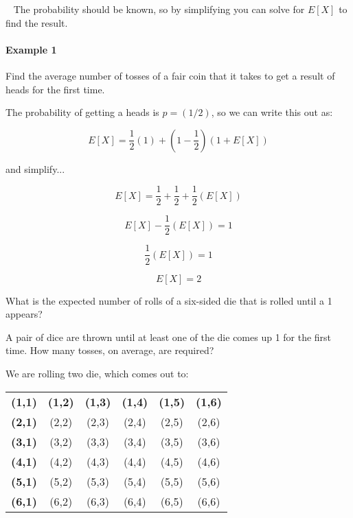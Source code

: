 {\begin{intro}{\ }
            The probability should be known, so by simplifying you
            can solve for $E[X]$ to find the result.

            \paragraph{Example 1}
                Find the average number of tosses of a fair coin that it takes
                to get a result of heads for the first time.

                The probability of getting a heads is $p = (1/2)$, so we
                can write this out as:

                $$ E[X] = \frac{1}{2}(1) + (1 - \frac{1}{2})(1 + E[X]) $$

                and simplify...

                $$ E[X] = \frac{1}{2} + \frac{1}{2} + \frac{1}{2}(E[X]) $$

                $$ E[X] - \frac{1}{2}(E[X]) = 1 $$

                $$ \frac{1}{2}(E[X]) = 1 $$

                $$ E[X] = 2 $$
        \end{intro}

    \newpage

    \begin{questionNOGRADE}{\thequestion}
        What is the expected number of rolls of a six-sided die
        that is rolled until a 1 appears? ~\\ \vspace{3cm}
    \end{questionNOGRADE}

    \hrulefill

    \begin{questionNOGRADE}{\thequestion}
        A pair of dice are thrown until at least one of the die comes
        up 1 for the first time. How many tosses,
        on average, are required?

        We are rolling two die, which comes out to:

        \begin{center}
            \footnotesize
            \begin{tabular}{c c c c c c}
                \textbf{(1,1)} & \textbf{(1,2)} & \textbf{(1,3)} & \textbf{(1,4)} & \textbf{(1,5)} & \textbf{(1,6)} \\
                \textbf{(2,1)} & (2,2) & (2,3) & (2,4) & (2,5) & (2,6) \\
                \textbf{(3,1)} & (3,2) & (3,3) & (3,4) & (3,5) & (3,6) \\
                \textbf{(4,1)} & (4,2) & (4,3) & (4,4) & (4,5) & (4,6) \\
                \textbf{(5,1)} & (5,2) & (5,3) & (5,4) & (5,5) & (5,6) \\
                \textbf{(6,1)} & (6,2) & (6,3) & (6,4) & (6,5) & (6,6)
            \end{tabular}
        \end{center}


\end{questionNOGRADE}}

